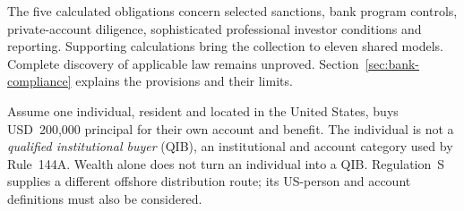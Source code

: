 The five calculated obligations concern selected sanctions, bank program
controls, private-account diligence, sophisticated professional investor
conditions and reporting. Supporting calculations bring the collection to
eleven shared models. Complete discovery of applicable law remains unproved.
Section~\ref{sec:bank-compliance} explains the provisions and their limits.

\clearpage
{}
Assume one individual, resident and located in the United States, buys
USD~200,000 principal for their own account and benefit. The individual is not
a \emph{qualified institutional buyer} (QIB), an institutional and account
category used by Rule~144A. Wealth alone does not turn an individual into a
QIB. Regulation~S supplies a different offshore distribution route; its
US-person and account definitions must also be considered.

